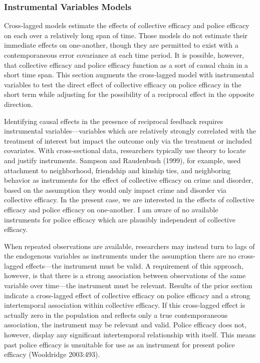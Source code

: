 \documentclass [11pt, proquest] {uwthesis}[2015/03/03]
\begin{document}
\hypertarget{instrumental-variables-models}{%
\subsubsection{Instrumental Variables Models}\label{instrumental-variables-models}}

Cross-lagged models estimate the effects of collective efficacy and police efficacy on each over a relatively long span of time. Those models do not estimate their immediate effects on one-another, though they are permitted to exist with a contemporaneous error covariance at each time period. It is possible, however, that collective efficacy and police efficacy function as a sort of causal chain in a short time span. This section augments the cross-lagged model with instrumental variables to test the direct effect of collective efficacy on police efficacy in the short term while adjusting for the possibility of a reciprocal effect in the opposite direction.

Identifying causal effects in the presence of reciprocal feedback requires instrumental variables---variables which are relatively strongly correlated with the treatment of interest but impact the outcome only via the treatment or included covariates. With cross-sectional data, researchers typically use theory to locate and justify instruments. Sampson and Raudenbush (1999), for example, used attachment to neighborhood, friendship and kinship ties, and neighboring behavior as instruments for the effect of collective efficacy on crime and disorder, based on the assumption they would only impact crime and disorder via collective efficacy. In the present case, we are interested in the effects of collective efficacy and police efficacy on one-another. I am aware of no available instruments for police efficacy which are plausibly independent of collective efficacy.

When repeated observations are available, researchers may instead turn to lags of the endogenous variables as instruments under the assumption there are no cross-lagged effects---the instrument must be valid. A requirement of this approach, however, is that there is a strong association between observations of the same variable over time---the instrument must be relevant. Results of the prior section indicate a cross-lagged effect of collective efficacy on police efficacy and a strong intertemporal association within collective efficacy. If this cross-lagged effect is actually zero in the population and reflects only a true contemporaneous association, the instrument may be relevant and valid. Police efficacy does not, however, display any significant intertemporal relationship with itself. This means past police efficacy is unsuitable for use as an instrument for present police efficacy (Wooldridge 2003:493).
\end{document}

